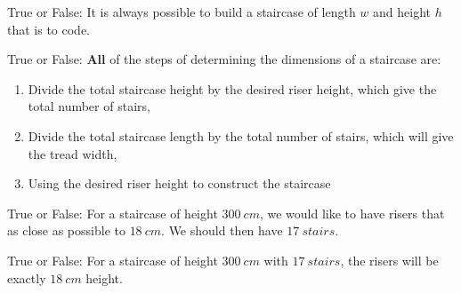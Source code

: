 \documentclass{../ximera}
\author{Claire Merriman}
\begin{document}
\maketitle



\begin{exercise}
  True or False: It is always possible to build a staircase of length $w$ and height $h$ that is to code. 
\end{exercise}
\vfill

\begin{exercise}
   True or False: \textbf{All} of the steps of determining the dimensions of a staircase are:
   
\begin{enumerate}
 \item Divide the total staircase height by the desired riser height, which give the total number of stairs,
 \item Divide the total staircase length by the total number of stairs, which will give the tread width,
 \item Using the desired riser height to construct the staircase
\end{enumerate}
\end{exercise}


\begin{exercise} True or False: 
 For a staircase of height $300\ cm$, we would like to have risers that as close as possible to $18\ cm$. We should then have $17\ stairs$.
\end{exercise}

\begin{exercise} True or False: 
 For a staircase of height $300\ cm$ with $17\ stairs$, the risers will be exactly $18\ cm$ height.
\end{exercise}
\end{document}
